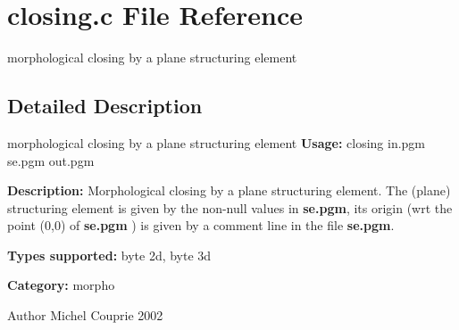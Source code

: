 \section{closing.c File Reference}
\label{closing_8c}


morphological closing by a plane structuring element  




\subsection{Detailed Description}
morphological closing by a plane structuring element {\bfseries Usage:} closing in.pgm se.pgm out.pgm

{\bfseries Description:} Morphological closing by a plane structuring element. The (plane) structuring element is given by the non-\/null values in {\bfseries se.pgm}, its origin (wrt the point (0,0) of {\bfseries se.pgm} ) is given by a comment line in the file {\bfseries se.pgm}.

{\bfseries Types supported:} byte 2d, byte 3d

{\bfseries Category:} morpho

\begin{DoxyAuthor}{Author}
Michel Couprie 2002 
\end{DoxyAuthor}
